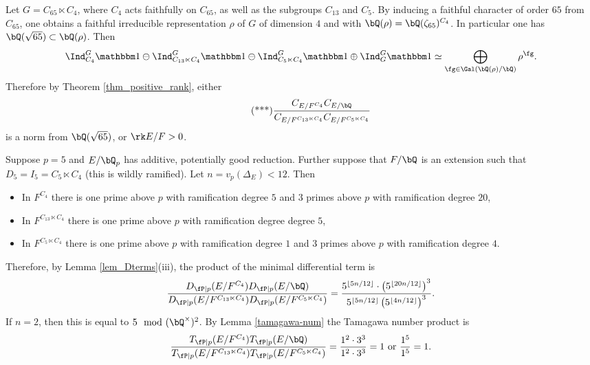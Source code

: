 \begin{example}
Let $G = C_{65} \ltimes C_4$, where $C_4$ acts faithfully on $C_{65}$, as well as the subgroups $C_{13}$ and $C_5$. By inducing a faithful character of order $65$ from $C_{65}$, one obtains a faithful irreducible representation $\rho$ of $G$ of dimension $4$ and with $\bQ(\rho) = \bQ(\zeta_{65})^{C_4}$. In particular one has $\bQ(\sqrt{65}) \subset \bQ(\rho)$. Then
\[ \Ind_{C_4}^G \trivial \ominus \Ind_{C_{13} \ltimes C_4}^G \trivial \ominus \Ind_{C_5 \ltimes C_4}^G \trivial \oplus \Ind_{G}^G \trivial \simeq \bigoplus_{\fg \in \Gal(\bQ(\rho) / \bQ)} \rho^{\fg} .\]
Therefore by Theorem \ref{thm_positive_rank}, either 
\begin{equation}\label{ex3}\tag{***}
\frac{C_{E / F^{C_4}} C_{E / \bQ} }{C_{E / F^{C_{13} \ltimes C_4}} C_{E / F^{C_5 \ltimes C_4}}}
\end{equation}
is a norm from $\bQ(\sqrt{65})$, or $\rk E / F > 0$.  

Suppose $p = 5$ and $E / \bQ_p$ has additive, potentially good reduction. Further suppose that $F / \bQ$ is an extension such that $D_{5} = I_{5} = C_5 \ltimes C_4$ (this is wildly ramified). Let $n = v_p(\Delta_E) < 12$. Then
\begin{itemize}[--]
    \setlength\itemsep{0em}
    \item In $F^{C_4}$ there is one prime above $p$ with ramification degree $5$ and $3$ primes above $p$ with ramification degree $20$,
    \item In $F^{C_{13} \ltimes C_4}$ there is one prime above $p$ with ramification degree degree $5$,
    \item In $F^{C_5 \ltimes C_4}$ there is one prime above $p$ with ramification degree $1$ and $3$ primes above $p$ with ramification degree $4$.
\end{itemize}
Therefore, by Lemma \ref{lem_Dterms}(iii), the product of the minimal differential term is 
\[ \frac{D_{\fP \mid p}(E / F^{C_4}) D_{\fP \mid p}(E / \bQ) }{D_{\fP \mid p}(E / F^{C_{13} \ltimes C_4}) D_{\fP \mid p}(E / F^{C_{5} \ltimes C_4})} = 
\frac{ 5^{\floor{5 n /12}} \cdot \left(5^{\floor{20 n /12}}\right)^3 }{5^{\floor{5 n /12}} \left(5^{\floor{4 n /12}}\right)^3} .\]
If $n = 2$, then this is equal to $5 \mod {(\bQ^{\times})^2}$. By Lemma \ref{tamagawa-num} the Tamagawa number product is
\[ \frac{T_{\fP \mid p}(E / F^{C_4}) T_{\fP \mid p}(E / \bQ) }{T_{\fP \mid p}(E / F^{C_{13} \ltimes C_4}) T_{\fP \mid p}(E / F^{C_{5} \ltimes C_4})} = \frac{1^2 \cdot 3^3 }{1^2 \cdot 3^3} = 1 \text{ or } \frac{1^5}{1^5} = 1.\]


\end{example}
